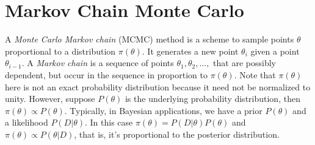 \section{Markov Chain Monte Carlo}\label{sec:mcmc}
\begin{comment}
  The treatment of Markov chains largely follows the presentation in \cite{markov_chains}. A Markov process is a scheme that from a given state (or value) $\mu$ generates a new state $\nu$ with a \textit{transition} probability $T(\nu|\mu)$. A Markov process has the following properties
\begin{itemize}
  \item The transition probabilities $T(\nu|\mu)$ are time-independent.
  \item $T(\nu|\mu)$ only depend on the states $\mu$ and $\nu$.
  \item The transition $\mu \to \mu$ is allowed, thus $T(\mu|\mu) > 0$. Hence, the new generated state may just be the same as the previous state.
  \item The transition probabilties must sum to unity, hence $\int_{\nu} T(\nu|\mu) = 1$. In other words, the procedure must generate some new state.
\end{itemize}

Two important principles, originally found by Metropolis et. al \cite{metropolis}, were introduced to make the MCMC chains computationally feasible. 
\begin{enumerate}
  \item \textbf{Ergodicity}: Any state $\nu$ can be reached from any other state $\mu$ given a long enough MCMC chain.
  \item \textbf{Detailed balance}: If the transition probabilities $T(\nu|\mu)$ obey the detailed balance equation, $$P(\mu)T(\nu|\mu) = P(\nu)T(\mu|\nu),$$
      then the Markov chain is guaranteed to be ergodic. The interpretation of this is that on average, the system makes the transition $\mu \to \nu$ just as often as the transition $\nu \to \mu$.
\end{enumerate}
\end{comment}

A \textit{Monte Carlo Markov chain} (MCMC) method is a scheme to sample points $\theta$ proportional to a distribution $\pi(\theta)$. It generates a new point $\theta_i$ given a point $\theta_{i-1}$. 
A \textit{Markov chain} is a sequence of points $\theta_1, \theta_2, \ldots,$ that are possibly dependent, but occur in the sequence in proportion to $\pi(\theta)$. Note that $\pi(\theta)$ here is not an exact probability distribution because it need not be normalized to unity.
However, suppose $P(\theta)$ is the underlying probability distribution, then $\pi(\theta) \propto P(\theta)$. Typically, in Bayesian applications, we have a prior $P(\theta)$ and a likelihood $P(D|\theta)$. In this case $\pi(\theta) = P(D|\theta)P(\theta)$ and 
$\pi(\theta) \propto P(\theta|D)$, that is, it's proportional to the posterior distribution.


